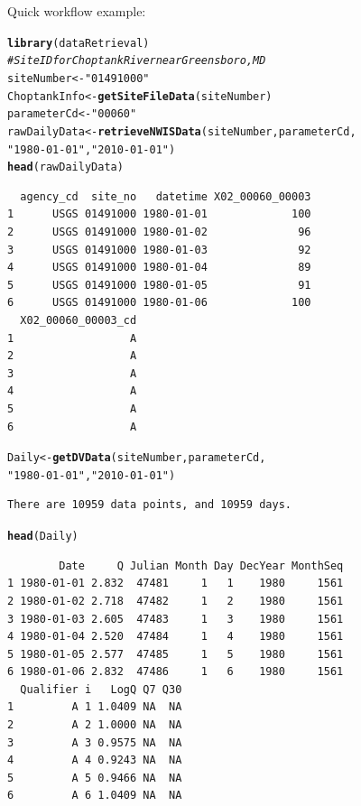 \documentclass[a4paper,11pt]{article}\usepackage[]{graphicx}\usepackage[]{color}
\makeatletter
\newcommand{\hlstr}[1]{\textcolor[rgb]{0.192,0.494,0.8}{#1}}%
\newcommand{\hlcom}[1]{\textcolor[rgb]{0.678,0.584,0.686}{\textit{#1}}}%
\newcommand{\hlstd}[1]{\textcolor[rgb]{0.345,0.345,0.345}{#1}}%
\newcommand{\hlkwb}[1]{\textcolor[rgb]{0.69,0.353,0.396}{#1}}%
\newcommand{\hlkwd}[1]{\textcolor[rgb]{0.737,0.353,0.396}{\textbf{#1}}}%
\newenvironment{kframe}{%
 \def\at@end@of@kframe{}%
 \ifinner\ifhmode%
  \def\at@end@of@kframe{\end{minipage}}%
  \begin{minipage}{\columnwidth}%
 \fi\fi%
 \def\FrameCommand##1{\hskip\@totalleftmargin \hskip-\fboxsep
 \colorbox{shadecolor}{##1}\hskip-\fboxsep
     \hskip-\linewidth \hskip-\@totalleftmargin \hskip\columnwidth}%
 \MakeFramed {\advance\hsize-\width
   \@totalleftmargin\z@ \linewidth\hsize
   \@setminipage}}%
 {\par\unskip\endMakeFramed%
 \at@end@of@kframe}
\newenvironment{knitrout}{}{} %
\makeatother
\begin{document}
\newpage
Quick workflow example:
\begin{knitrout}
\color{fgcolor}\begin{kframe}
\begin{alltt}
\hlkwd{library}\hlstd{(dataRetrieval)}
\hlcom{# Site ID for Choptank River near Greensboro, MD}
\hlstd{siteNumber} \hlkwb{<-} \hlstr{"01491000"}
\hlstd{ChoptankInfo} \hlkwb{<-} \hlkwd{getSiteFileData}\hlstd{(siteNumber)}
\hlstd{parameterCd} \hlkwb{<-} \hlstr{"00060"}
\hlstd{rawDailyData} \hlkwb{<-} \hlkwd{retrieveNWISData}\hlstd{(siteNumber,parameterCd,}
                      \hlstr{"1980-01-01"}\hlstd{,}\hlstr{"2010-01-01"}\hlstd{)}
\hlkwd{head}\hlstd{(rawDailyData)}
\end{alltt}
\begin{verbatim}
  agency_cd  site_no   datetime X02_00060_00003
1      USGS 01491000 1980-01-01             100
2      USGS 01491000 1980-01-02              96
3      USGS 01491000 1980-01-03              92
4      USGS 01491000 1980-01-04              89
5      USGS 01491000 1980-01-05              91
6      USGS 01491000 1980-01-06             100
  X02_00060_00003_cd
1                  A
2                  A
3                  A
4                  A
5                  A
6                  A
\end{verbatim}
\begin{alltt}
\hlstd{Daily} \hlkwb{<-} \hlkwd{getDVData}\hlstd{(siteNumber,parameterCd,}
                      \hlstr{"1980-01-01"}\hlstd{,}\hlstr{"2010-01-01"}\hlstd{)}
\end{alltt}
\begin{verbatim}
There are 10959 data points, and 10959 days.
\end{verbatim}
\begin{alltt}
\hlkwd{head}\hlstd{(Daily)}
\end{alltt}
\begin{verbatim}
        Date     Q Julian Month Day DecYear MonthSeq
1 1980-01-01 2.832  47481     1   1    1980     1561
2 1980-01-02 2.718  47482     1   2    1980     1561
3 1980-01-03 2.605  47483     1   3    1980     1561
4 1980-01-04 2.520  47484     1   4    1980     1561
5 1980-01-05 2.577  47485     1   5    1980     1561
6 1980-01-06 2.832  47486     1   6    1980     1561
  Qualifier i   LogQ Q7 Q30
1         A 1 1.0409 NA  NA
2         A 2 1.0000 NA  NA
3         A 3 0.9575 NA  NA
4         A 4 0.9243 NA  NA
5         A 5 0.9466 NA  NA
6         A 6 1.0409 NA  NA
\end{verbatim}

\end{kframe}
\end{knitrout}
\end{document}

